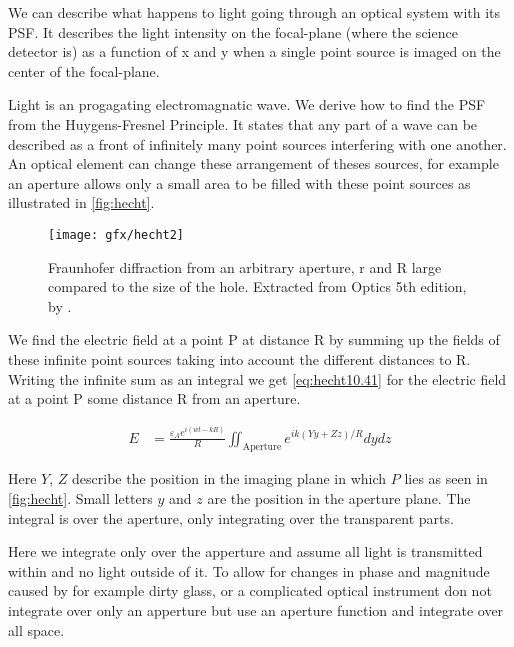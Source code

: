 We can describe what happens to light going through an optical system with its \ac{PSF}. It describes the light intensity on the focal-plane (where the science detector is) as a function of x and y when a single point source is imaged on the center of the focal-plane. 

Light is an progagating electromagnatic wave. We derive how to find the \ac{PSF} from the Huygens-Fresnel Principle. It states that any part of a wave can be described as a front of infinitely many point sources interfering with one another. An optical element can change these arrangement of theses sources, for example an aperture allows only a small area to be filled with these point sources as illustrated in \autoref{fig:hecht}. 

\begin{figure}[h]
    \caption{Fraunhofer diffraction from an arbitrary aperture, r and R large compared to the size of the hole. Extracted from Optics 5th edition, by \cite{hecht}.}
    \centering
    \texttt{[image: gfx/hecht2]}
    \label{fig:hecht}
\end{figure}

We find the electric field at a point P at distance R by summing up the fields of these infinite point sources taking into account the different distances to R. Writing the infinite sum as an integral we get \autoref{eq:hecht10.41} for the electric field at a point P some distance R from an aperture.

\begin{subequations}
    \begin{align}
        E &= \frac{\varepsilon_A e^{i(wt-kR)}}{R} \iint_{\text{Aperture}} e^{ik(Yy+Zz)/R} dydz%
        \label{eq:hecht10.41}
    \end{align}
\end{subequations}

Here $Y$, $Z$ describe the position in the imaging plane in which $P$ lies as seen in \autoref{fig:hecht}. Small letters $y$ and $z$ are the position in the aperture plane. The integral is over the aperture, only integrating over the transparent parts. 

Here we integrate only over the apperture and assume all light is transmitted within and no light outside of it. To allow for changes in phase and magnitude caused by for example dirty glass, or a complicated optical instrument don not integrate over only an apperture but use an aperture function and integrate over all space.

